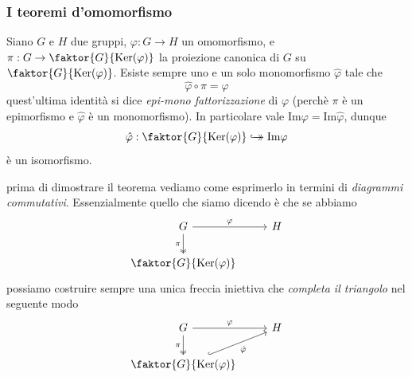 \documentclass[11pt]{scrartcl}
\newcommand{\bij}{\hookrightarrow\mathrel{\mspace{-15mu}}\rightarrow}
\renewcommand{\ker}[1]{\text{Ker}\!\left(#1\right)}
\begin{document}
	\subsubsection{I teoremi d'omomorfismo}
	\begin{theorem}
		Siano $G$ e $H$ due gruppi, $\varphi:G\to H$ un omomorfismo, e $\pi:G\to \faktor{G}{\ker{\varphi}}$ la proiezione canonica di $G$ su $\faktor{G}{\ker{\varphi}}$. Esiste sempre uno e un solo monomorfismo $\hat{\varphi}$ tale che 
		$$\hat{\varphi}\circ \pi =\varphi$$
		quest'ultima identità si dice \textit{epi-mono fattorizzazione} di $\varphi$ (perchè $\pi$ è un epimorfismo e $\hat{\varphi}$ è un monomorfismo). In particolare vale $\text{Im}\varphi=\text{Im}\hat{\varphi}$, dunque 
		$$\hat{\varphi}:\faktor{G}{\ker{\varphi}}\bij \text{Im}\varphi$$
		è un isomorfismo.
	\end{theorem}
	prima di dimostrare il teorema vediamo come esprimerlo in termini di \textit{diagrammi commutativi}. Essenzialmente quello che siamo dicendo è che se abbiamo
	$$
	\begin{tikzcd}
		G \arrow{r}{\varphi} \arrow[swap,d,two heads,"\pi"] & H \\
		\faktor{G}{\ker{\varphi}} 
	\end{tikzcd}
	$$
	possiamo costruire sempre una unica freccia iniettiva che \textit{completa il triangolo} nel seguente modo
	$$
	\begin{tikzcd}
		G \arrow{r}{\varphi} \arrow[swap,d,two heads,"\pi"] & H \\
		\faktor{G}{\ker{\varphi}} \arrow[swap,ru,hook,"\hat{\varphi}"]
	\end{tikzcd}
	$$ 
\end{document}
